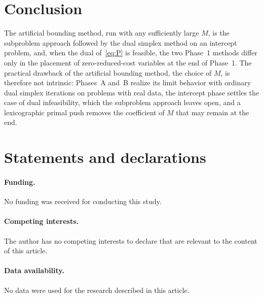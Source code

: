 \documentclass[11pt,a4paper]{article}
\theoremstyle{plain}
\theoremstyle{definition}
\theoremstyle{remark}
\begin{document}
\section{Conclusion}
\label{sec:conclusion}

The artificial bounding method, run with any sufficiently large $M$, is the subproblem approach followed by the dual simplex method on an intercept problem, and, when the dual of~\eqref{eq:P} is feasible, the two Phase~1 methods differ only in the placement of zero-reduced-cost variables at the end of Phase~1. The practical drawback of the artificial bounding method, the choice of $M$, is therefore not intrinsic: Phases~A and~B realize its limit behavior with ordinary dual simplex iterations on problems with real data, the intercept phase settles the case of dual infeasibility, which the subproblem approach leaves open, and a lexicographic primal push removes the coefficient of $M$ that may remain at the end.

\section*{Statements and declarations}

\paragraph{Funding.} No funding was received for conducting this study.

\paragraph{Competing interests.} The author has no competing interests to declare that are relevant to the content of this article.

\paragraph{Data availability.} No data were used for the research described in this article.
\end{document}
